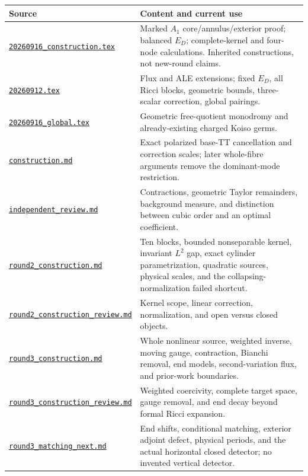 \documentclass[a4paper,11pt]{article}
\theoremstyle{definition}
\begin{document}
\small
\begin{longtable}{L{.34\textwidth}L{.59\textwidth}}
\toprule Source & Content and current use\\\midrule\endhead
\href{20260916_construction.tex}{\nolinkurl{20260916_construction.tex}}
& Marked $A_1$ core/annulus/exterior proof; balanced $E_D$; complete-kernel and four-node calculations. Inherited constructions, not new-round claims.\\
\href{20260912.tex}{\nolinkurl{20260912.tex}}
& Flux and ALE extensions; fixed $E_D$, all Ricci blocks, geometric bounds, three-scalar correction, global pairings.\\
\href{20260916_global.tex}{\nolinkurl{20260916_global.tex}}
& Geometric free-quotient monodromy and already-existing charged Koiso germs.\\
\href{../references/rounds/construction.md}{\nolinkurl{construction.md}}
& Exact polarized base-TT cancellation and correction scales; later whole-fibre arguments remove the dominant-mode restriction.\\
\href{../references/rounds/independent_review.md}{\nolinkurl{independent_review.md}}
& Contractions, geometric Taylor remainders, background measure, and distinction between cubic order and an optimal coefficient.\\
\href{../references/rounds/round2_construction.md}{\nolinkurl{round2_construction.md}}
& Ten blocks, bounded nonseparable kernel, invariant $L^2$ gap, exact cylinder parametrization, quadratic sources, physical scales, and the collapsing-normalization failed shortcut.\\
\href{../references/rounds/round2_construction_review.md}{\nolinkurl{round2_construction_review.md}}
& Kernel scope, linear correction, normalization, and open versus closed objects.\\
\href{../references/rounds/round3_construction.md}{\nolinkurl{round3_construction.md}}
& Whole nonlinear source, weighted inverse, moving gauge, contraction, Bianchi removal, end models, second-variation flux, and prior-work boundaries.\\
\href{../references/rounds/round3_construction_review.md}{\nolinkurl{round3_construction_review.md}}
& Weighted coercivity, complete target space, gauge removal, and end decay beyond formal Ricci expansion.\\
\href{../references/rounds/round3_matching_next.md}{\nolinkurl{round3_matching_next.md}}
& End shifts, conditional matching, exterior adjoint defect, physical periods, and the actual horizontal closed detector; no invented vertical detector.\\

\end{longtable}
\end{document}
